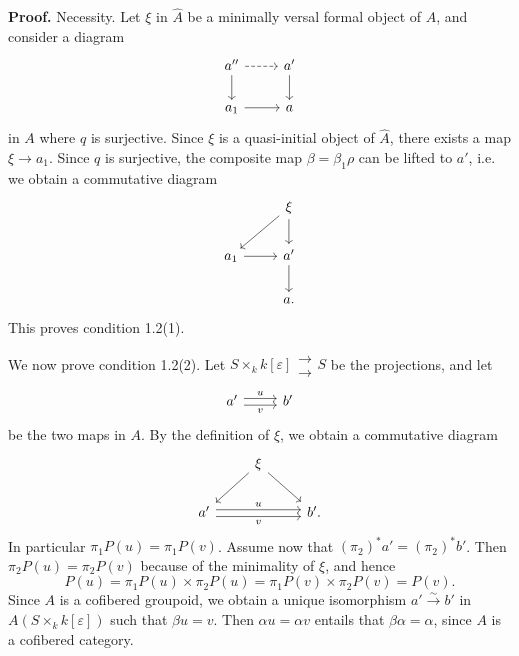 \documentclass[11pt]{article}
\begin{document}
\textbf{Proof.} Necessity. Let $\xi$ in $\widehat A$ be a minimally versal formal object of $A$, and consider a diagram
\[
\begin{tikzcd}
 a'' \arrow[r,dashed] \arrow[d] & a' \arrow[d]\\
 a_1 \arrow[r] & a
\end{tikzcd}
\]
in $A$ where $q$ is surjective. Since $\xi$ is a quasi-initial object of $\widehat A$, there exists a map $\xi\to a_1$. Since $q$ is surjective, the composite map $\beta=\beta_1\rho$ can be lifted to $a'$, i.e. we obtain a commutative diagram
\[
\begin{tikzcd}
& \xi \arrow[dl] \arrow[d] \\
a_1 \arrow[r] & a' \arrow[d]\\
& a .
\end{tikzcd}
\]
This proves condition 1.2(1).

We now prove condition 1.2(2). Let $S\times_k k[\varepsilon]\mathrel{\substack{\longrightarrow\\[-.6ex]\longrightarrow}} S$ be the projections, and let
\[
\begin{tikzcd}
 a' \arrow[r,shift left,"u"] \arrow[r,shift right,"v"'] & b'
\end{tikzcd}
\]
be the two maps in $A$. By the definition of $\xi$, we obtain a commutative diagram
\[
\begin{tikzcd}
& \xi \arrow[dl] \arrow[dr] &\\
a' \arrow[rr,shift left,"u"] \arrow[rr,shift right,"v"'] && b' .
\end{tikzcd}
\]
In particular $\pi_1P(u)=\pi_1P(v)$. Assume now that $(\pi_2)^*a'=(\pi_2)^*b'$. Then $\pi_2P(u)=\pi_2P(v)$ because of the minimality of $\xi$, and hence
\[
 P(u)=\pi_1P(u)\times\pi_2P(u)=\pi_1P(v)\times\pi_2P(v)=P(v).
\]
Since $A$ is a cofibered groupoid, we obtain a unique isomorphism $a'\xrightarrow{\sim}b'$ in $A(S\times_k k[\varepsilon])$ such that $\beta u=v$. Then $\alpha u=\alpha v$ entails that $\beta\alpha=\alpha$, since $A$ is a cofibered category.
\end{document}
